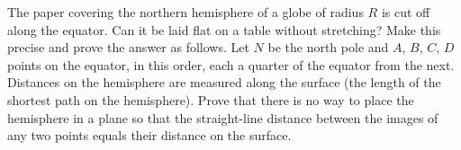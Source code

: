 The paper covering the northern hemisphere of a globe of radius $R$ is cut off along the equator. Can it be laid flat on a table without stretching? Make this precise and prove the answer as follows. Let $N$ be the north pole and $A$, $B$, $C$, $D$ points on the equator, in this order, each a quarter of the equator from the next. Distances on the hemisphere are measured along the surface (the length of the shortest path on the hemisphere). Prove that there is no way to place the hemisphere in a plane so that the straight-line distance between the images of any two points equals their distance on the surface.
